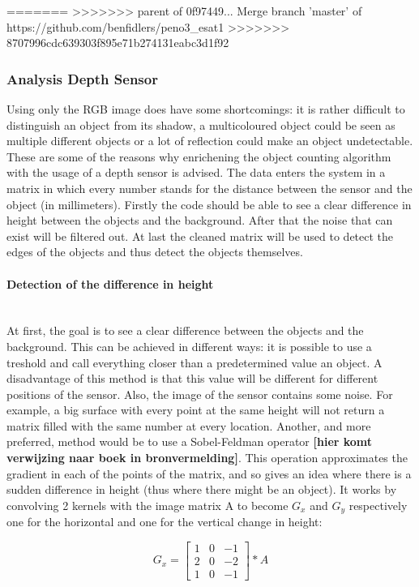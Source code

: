 \documentclass[11pt]{article}
\begin{document}
=======
>>>>>>> parent of 0f97449... Merge branch 'master' of https://github.com/benfidlers/peno3_esat1
>>>>>>> 8707996cdc639303f895e71b274131eabc3d1f92
\subsubsection{Analysis Depth Sensor}
Using only the RGB image does have some shortcomings: it is rather difficult to distinguish an object from its shadow, a multicoloured object could be seen as multiple different objects or a lot of reflection could make an object undetectable. These are some of the reasons why enrichening the object counting algorithm with the usage of a depth sensor is advised. The data enters the system in a matrix in which every number stands for the distance between the sensor and the object (in millimeters). Firstly the code should be able to see a clear difference in height between the objects and the background. After that the noise that can exist will be filtered out. At last the cleaned matrix will be used to detect the edges of the objects and thus detect the objects themselves.
 
\paragraph{Detection of the difference in height}\mbox{}\\
At first, the goal is to see a clear difference between the objects and the background. This can be achieved in different ways: it is possible to use a treshold and call everything closer than a predetermined value an object. A disadvantage of this method is that this value will be different for different positions of the sensor. Also, the image of the sensor contains some noise. For example, a big surface with every point at the same height will not return a matrix filled with the same number at every location. Another, and more preferred, method would be to use a Sobel-Feldman operator \textbf{[hier komt verwijzing naar boek in bronvermelding]}. This operation approximates the gradient in each of the points of the matrix, and so gives an idea where there is a sudden difference in height (thus where there might be an object). It works by convolving 2 kernels with the image matrix A to become $G_{x}$ and $G_{y}$ respectively one for the horizontal and one for the vertical change in height: 

\begin{equation}
G_{x} = 
\begin{bmatrix}
	1&0&-1\\
	2&0&-2\\
	1&0&-1
\end{bmatrix}
*A
\end{equation}
\end{document}
